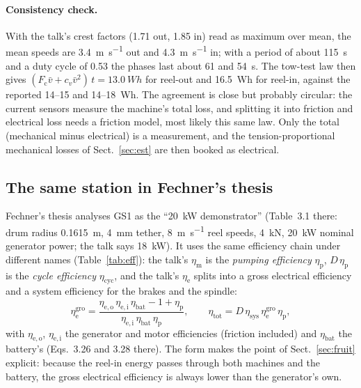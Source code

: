 \documentclass[11pt,a4paper]{article}
\begin{document}
\paragraph{Consistency check.} With the talk's crest factors (1.71 out,
1.85 in) read as maximum over mean, the mean speeds are \SI{3.4}{m.s^{-1}} out
and \SI{4.3}{m.s^{-1}} in; with a period of about \SI{115}{s} and a duty cycle
of 0.53 the phases last about 61 and \SI{54}{s}. The tow-test law then gives
$(F_\mathrm{c}\bar v + c_v \bar v^2)\,t = \SI{13.0}{Wh}$ for reel-out and
\SI{16.5}{Wh} for reel-in, against the reported 14--15 and 14--\SI{18}{Wh}.
The agreement is close but probably circular: the current sensors measure the
machine's total loss, and splitting it into friction and electrical loss needs
a friction model, most likely this same law. Only the total (mechanical minus
electrical) is a measurement, and the tension-proportional mechanical losses
of Sect.~\ref{sec:est} are then booked as electrical.

\subsection{The same station in Fechner's thesis}
\label{sec:thesis}
Fechner's thesis \cite{fechner2016} analyses GS1 as the ``20~kW
demonstrator'' (Table~3.1 there: drum radius \SI{0.1615}{m}, \SI{4}{mm}
tether, \SI{8}{m.s^{-1}} reel speeds, \SI{4}{kN}, \SI{20}{kW} nominal
generator power; the talk says \SI{18}{kW}). It uses the same efficiency
chain under different names (Table~\ref{tab:eff}): the talk's $\eta_\mathrm{m}$
is the \emph{pumping efficiency} $\eta_\mathrm{p}$, $D\,\eta_\mathrm{p}$ is the
\emph{cycle efficiency} $\eta_\mathrm{cyc}$, and the talk's $\eta_\mathrm{e}$
splits into a gross electrical efficiency and a system efficiency for the
brakes and the spindle:
\begin{equation}
  \eta_\mathrm{e}^\mathrm{gro} =
  \frac{\eta_\mathrm{e,o}\,\eta_\mathrm{e,i}\,\eta_\mathrm{bat} - 1 + \eta_\mathrm{p}}
       {\eta_\mathrm{e,i}\,\eta_\mathrm{bat}\,\eta_\mathrm{p}} , \qquad
  \eta_\mathrm{tot} = D\,\eta_\mathrm{sys}\,\eta_\mathrm{e}^\mathrm{gro}\,\eta_\mathrm{p} ,
\end{equation}
with $\eta_\mathrm{e,o}$, $\eta_\mathrm{e,i}$ the generator and motor
efficiencies (friction included) and $\eta_\mathrm{bat}$ the battery's
(Eqs.~3.26 and 3.28 there). The form makes the point of
Sect.~\ref{sec:fruit} explicit: because the reel-in energy passes through
both machines and the battery, the gross electrical efficiency is always
lower than the generator's own.
\end{document}
